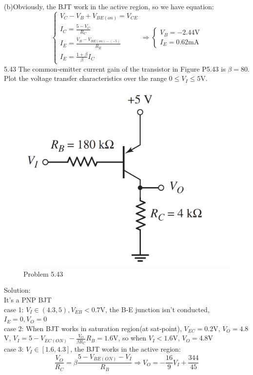 \documentclass[a4paper,11pt,UTF8]{article}
\begin{document}
(b)Obviously, the BJT work in the active region, so we have equation:
$$\begin{cases}
	V_C-V_B+V_{BE(on)}=V_{CE}\\
	\displaystyle I_C=\frac{5-V_C}{R_C}\\
	\displaystyle I_E=\frac{V_{B}-V_{BE(on)-(-5)}}{R_E}\\
	\displaystyle I_E=\frac{1+\beta}{\beta}I_C
\end{cases}\Rightarrow 
\begin{cases}
	V_B=-2.44\mathrm{V}\\
	I_E=0.62\mathrm{mA}
\end{cases}
$$
5.43 The common-emitter current gain of the transistor in Figure P5.43 is $\beta = 80$.
Plot the voltage transfer characteristics over the range $0 \leq V_I \leq 5 $V.
\begin{figure}[H] 
	\centering 
	\includegraphics[scale=0.15]{MD5.43.png}
	\caption{Problem 5.43}
\end{figure}
\noindent Solution:\\
It's a PNP BJT\\
case 1: $V_I\in(4.3,5), V_{EB}<0.7$V, the B-E junction isn't conducted, $I_E=0, V_O=0$\\
case 2: When BJT works in saturation region(at sat-point), $V_{EC}=0.2$V, $V_O=4.8$V, $\displaystyle V_I=5-V_{EC(ON)}-\frac{V_O}{\beta R_C}R_B=1.6$V, so when $V_I<1.6$V, $V_O=4.8$V\\
case 3: $V_I\in[1.6,4.3]$, the BJT works in the active region:$$\displaystyle\frac{V_O}{R_C}=\beta\frac{5-V_{BE(ON)}-V_I}{R_B}\Rightarrow V_O=-\frac{16}{9}V_I+\frac{344}{45}$$\\
\end{document}
